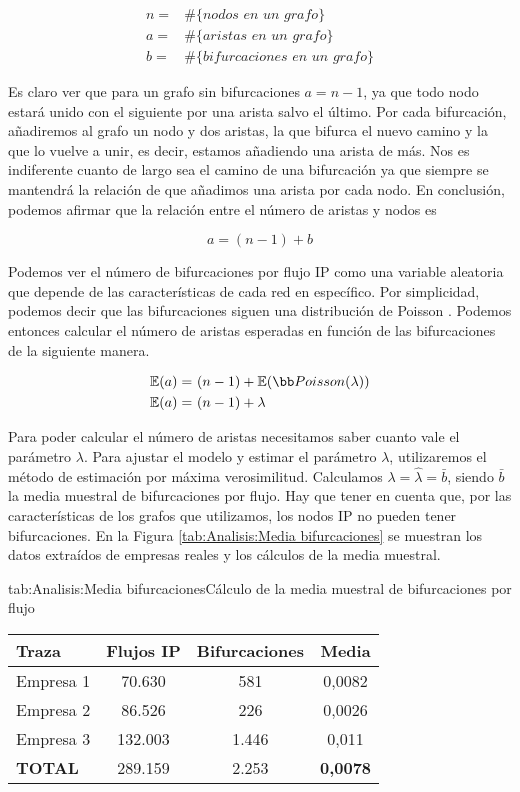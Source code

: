 \documentclass[tfg,epsbased,lof,lot,loa,final,nocopyright,overleaf]{tfgtfmthesisuam}
\begin{document}
\begin{align*}
	n =& \mathbin{\#}\{\textit{nodos en un grafo}\} \\
	a =& \mathbin{\#}\{\textit{aristas en un grafo}\} \\
	b =& \mathbin{\#}\{\textit{bifurcaciones en un grafo}\}
\end{align*}

Es claro ver que para un grafo sin bifurcaciones $a = n-1$, ya que todo nodo estará unido con el siguiente por una arista salvo el último. Por cada bifurcación, añadiremos al grafo un nodo y dos aristas, la que bifurca el nuevo camino y la que lo vuelve a unir, es decir, estamos añadiendo una arista de más. Nos es indiferente cuanto de largo sea el camino de una bifurcación ya que siempre se mantendrá la relación de que añadimos una arista por cada nodo. En conclusión, podemos afirmar que la relación entre el número de aristas y nodos es

$$a = (n - 1) + b$$

Podemos ver el número de bifurcaciones por flujo IP como una variable aleatoria que depende de las características de cada red en específico. Por simplicidad, podemos decir que las bifurcaciones siguen una distribución de Poisson \cite{Spiegel}. Podemos entonces calcular el número de aristas esperadas en función de las bifurcaciones de la siguiente manera.

\begin{align*}
    \mathbb{E}(a) =&\ (n - 1) + \mathbb{E}(\bb Poisson(\lambda))\\
    \mathbb{E}(a) =&\ (n - 1) + \lambda \
\end{align*}

Para poder calcular el número de aristas necesitamos saber cuanto vale el parámetro $\lambda$. Para ajustar el modelo y estimar el parámetro $\lambda$, utilizaremos el método de estimación por máxima verosimilitud. Calculamos $\lambda = \widehat{\lambda} = \bar{b}$, siendo $\bar{b}$ la media muestral de bifurcaciones por flujo. Hay que tener en cuenta que, por las características de los grafos que utilizamos, los nodos IP no pueden tener bifurcaciones. En la Figura \ref{tab:Analisis:Media bifurcaciones} se muestran los datos extraídos de empresas reales y los cálculos de la media muestral.

\begin{table}{tab:Analisis:Media bifurcaciones}{Cálculo de la media muestral de bifurcaciones por flujo}
	\begin{tabular}{lccc}
		\toprule \textbf{Traza} & \textbf{Flujos IP}  & \textbf{Bifurcaciones} & \textbf{Media} \\ 
		\midrule
		Empresa 1 & 70.630 & 581 & 0,0082 \\
		Empresa 2 & 86.526 & 226 & 0,0026 \\
		Empresa 3 & 132.003 & 1.446 & 0,011 \\
		\textbf{TOTAL} & 289.159 & 2.253 & \textbf{0,0078} \\
		\bottomrule
	\end{tabular}
\end{table}
\end{document}
